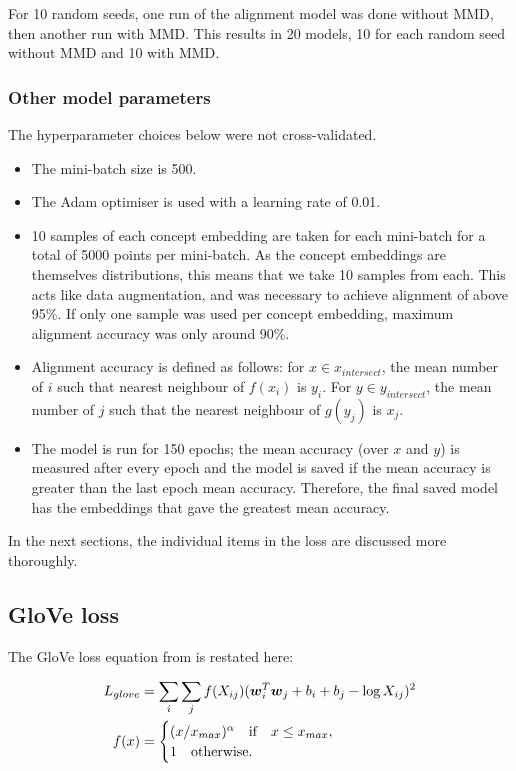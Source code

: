 For 10 random seeds, one run of the alignment model was done without MMD, then another run with MMD. This results in 20 models, 10 for each random seed without MMD and 10 with MMD. 

\subsubsection{Other model parameters}

The hyperparameter choices below were not cross-validated. 

\label{section:otherparameters}
\begin{itemize}
    \item The mini-batch size is 500.
    \item The Adam optimiser is used with a learning rate of 0.01.
    \item 10 samples of each concept embedding are taken for each mini-batch for a total of 5000 points per mini-batch. As the concept embeddings are themselves distributions, this means that we take 10 samples from each. This acts like data augmentation, and was necessary to achieve alignment of above 95\%. If only one sample was used per concept embedding, maximum alignment accuracy was only around 90\%. 
    \item Alignment accuracy is defined as follows: for $x \in x_{intersect}$, the mean number of $i$ such that nearest neighbour of $f(x_i)$ is  $y_i$. For $y \in y_{intersect}$, the mean number of $j$ such that the nearest neighbour of $g(y_j)$ is $x_j$. 
    \item The model is run for 150 epochs; the mean accuracy (over $x$ and $y$) is measured after every epoch and the model is saved if the mean accuracy is greater than the last epoch mean accuracy. Therefore, the final saved model has the embeddings that gave the greatest mean accuracy. 
\end{itemize}


In the next sections, the individual items in the loss are discussed more thoroughly.

\subsection{GloVe loss}
\label{section:gloveloss}
The GloVe loss equation from \cite{pennington2014glove} is restated here:

\begin{equation*}
\begin{split}
L_{glove} &= \sum_i \sum_j f(X_{ij}) (\boldsymbol{w}_i^T \boldsymbol{w}_j + b_i + b_j - \log X_{ij})^2\\
f(x) &= \begin{cases}
(x/x_{max})^{\alpha}\quad \text{if} \quad x \le x_{max},\\
1\quad \text{otherwise.} \quad
\end{cases}
\end{split}
\end{equation*}

